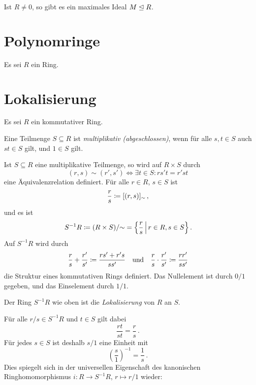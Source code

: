 \begin{corollary}
  Ist $R \neq 0$, so gibt es ein maximales Ideal $M \mathrel{\trianglelefteq} R$.
\end{corollary}





\section{Polynomringe}

Es sei $R$ ein Ring.





\section{Lokalisierung}

Es sei $R$ ein kommutativer Ring.

\begin{definition}
  Eine Teilmenge $S \subseteq R$ ist \emph{multiplikativ \textup(abgeschlossen\textup)}, wenn für alle $s, t \in S$ auch $st \in S$ gilt, und $1 \in S$ gilt.
\end{definition}

Ist $S \subseteq R$ eine multiplikative Teilmenge, so wird auf $R \times S$ durch
\begin{equation}
\label{equation: formula for localization}
        (r,s) \sim (r', s')
  \iff  \exists t \in S:
        rs't = r'st
\end{equation}
eine Äquivalenzrelation definiert.
Für alle $r \in R$, $s \in S$ ist
\[
            \frac{r}{s}
  \coloneqq  [(r,s)]_{\sim} \,,
\]
und es ist
\[
            S^{-1} R
  \defined  (R \times S)/{\sim}
  =         \left\{
              \frac{r}{s}
            \suchthat*
              r \in R,
              s \in S
            \right\}.
\]
Auf $S^{-1} R$ wird durch
\[
              \frac{r}{s}
            + \frac{r'}{s'}
  \coloneqq  \frac{rs' + r's}{ss'}
  \quad\text{und}\quad
                  \frac{r}{s}
            \cdot \frac{r'}{s'}
  \coloneqq  \frac{rr'}{ss'}
\]
die Struktur eines kommutativen Rings definiert.
Das Nullelement ist durch $0/1$ gegeben, und das Einselement durch $1/1$.

\begin{definition}
  Der Ring $S^{-1} R$ wie oben ist die \emph{Lokalisierung} von $R$ an $S$.
\end{definition}


Für alle $r/s \in S^{-1} R$ und $t \in S$ gilt dabei
\[
    \frac{rt}{st}
  = \frac{r}{s} \,.
\]
Für jedes $s \in S$ ist deshalb $s/1$ eine Einheit mit
\[
    \left( \frac{s}{1} \right)^{-1}
  = \frac{1}{s} \,.
\]
Dies spiegelt sich in der universellen Eigenschaft des kanonischen Ringhomomorphismus $i \colon R \to S^{-1} R$, $r \mapsto r/1$ wieder:

